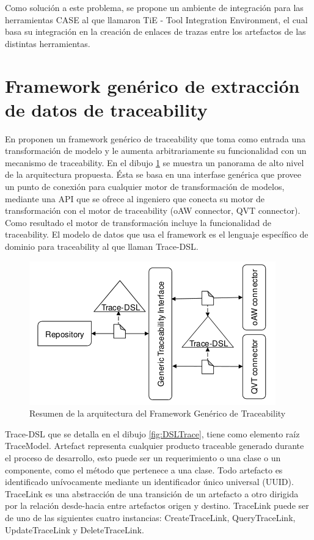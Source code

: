 \documentclass[a4paper,12pt,oneside]{book}
\begin{document}
Como solución a este problema, se propone un ambiente de integración para las herramientas CASE al que llamaron TiE - Tool Integration Environment, el cual basa su integración en la creación de enlaces de trazas entre los artefactos de las distintas herramientas.

\section{Framework genérico de extracción de datos de traceability}

En \cite{GrammelKastenholz} proponen un framework genérico de traceability que toma como entrada una transformación de modelo y le aumenta arbitrariamente su funcionalidad con un mecanismo de traceability. En el dibujo \ref{fig:GenericoArquitectura} se muestra un panorama de alto nivel de la arquitectura propuesta. Ésta se basa en una interfase genérica que provee un punto de conexión para cualquier motor de transformación de modelos, mediante una API que se ofrece al ingeniero que conecta su motor de transformación con el motor de traceability (oAW connector, QVT connector). Como resultado el motor de transformación incluye la funcionalidad de traceability. El modelo de datos que usa el framework es el lenguaje específico de dominio para traceability al que llaman Trace-DSL.

\begin{figure}[hbtp]
\centering
\includegraphics[scale=.7]{./img/GenericTraceFrame_Arquitectura}
\caption{Resumen de la arquitectura del Framework Genérico de Traceability}
\label{fig:GenericoArquitectura}
\end{figure}


Trace-DSL que se detalla en el dibujo \ref{fig:DSLTrace}, tiene como elemento raíz TraceModel. Artefact representa cualquier producto traceable generado durante el proceso de desarrollo, esto puede ser un requerimiento o una clase o un componente, como el método que pertenece a una clase. Todo artefacto es identificado unívocamente mediante un identificador único universal (UUID). TraceLink es una abstracción de una transición de un artefacto a otro dirigida por la relación desde-hacia entre artefactos origen y destino. TraceLink puede ser de uno de las siguientes cuatro instancias: CreateTraceLink, QueryTraceLink, UpdateTraceLink y DeleteTraceLink.
\end{document}
